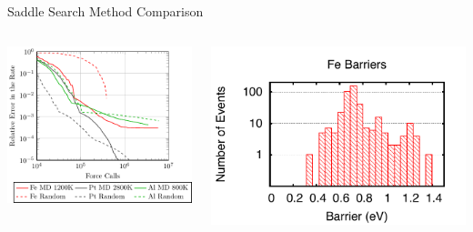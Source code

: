 \documentclass[onlymath]{beamer}
\begin{document}
\begin{frame}{Saddle Search Method Comparison}

\begin{columns}
\begin{column}{0.6\textwidth}
\includegraphics[width=\columnwidth]{images/saddle-search-comparison.pdf}
\end{column}
\begin{column}{0.4\textwidth}
\includegraphics[width=\columnwidth]{images/fe-barriers.pdf}


\end{column}
\end{columns}
\end{frame}
\end{document}

